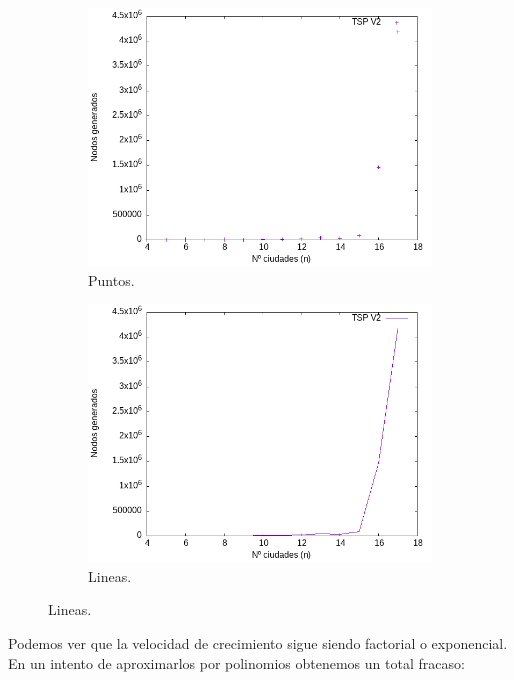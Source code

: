 \documentclass{article}
\begin{document}
\begin{figure}[H]
    \centering
    \begin{subfigure}[b]{0.45\textwidth}
        \centering
        \includegraphics[width=\textwidth]{imagenes/Data/salidaSoloPuntos.png}
        \caption{Puntos.}
    \end{subfigure}
    \begin{subfigure}[b]{0.45\textwidth}
        \centering
        \includegraphics[width=\textwidth]{imagenes/Data/salidaSoloLineas.png}
        \caption{Lineas.}
    \end{subfigure}
\end{figure}

Podemos ver que la velocidad de crecimiento sigue siendo factorial o exponencial. En un intento de aproximarlos por polinomios obtenemos un total fracaso: 
\end{document}
